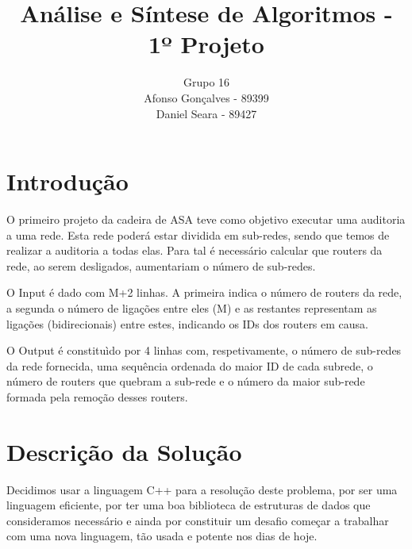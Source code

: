 \documentclass[12pt]{article}
\begin{document}
\title{Análise e Síntese de Algoritmos - 1º Projeto}
\author{Grupo 16 \\ Afonso Gonçalves - 89399 \\ Daniel Seara - 89427}
\date{}
\maketitle


\thispagestyle{fancy}



\section{Introdução}
    O primeiro projeto da cadeira de ASA teve como objetivo executar uma auditoria a uma 
    rede. Esta rede poderá estar dividida em sub-redes, sendo que temos de realizar a 
    auditoria a todas elas. Para tal é necessário calcular que routers da rede, ao serem 
    desligados, aumentariam o número de sub-redes.
    \par
    O Input é dado com M+2 linhas. A primeira indica o número de routers da rede, a segunda 
    o número de ligações entre eles (M) e as restantes representam as ligações (bidirecionais) 
    entre estes, indicando os IDs dos routers em causa.
    \par
    O Output é constituìdo por 4 linhas com, respetivamente, o número de sub-redes da
    rede fornecida, uma sequência ordenada do maior ID de cada subrede, o número de routers 
    que quebram a sub-rede e o número da maior sub-rede formada pela remoção desses routers.
    \par
\section{Descrição da Solução}
    \par
    Decidimos usar a linguagem C++ para a resolução deste problema,
    por ser uma linguagem eficiente, por ter uma boa biblioteca de estruturas de dados 
    que consideramos necessário e ainda por constituir um desafio começar a trabalhar 
    com uma nova linguagem, tão usada e potente nos dias de hoje.
\end{document}
